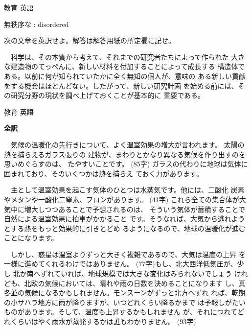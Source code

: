 \documentclass[fleqn]{jbook}
\begin{document}
\begin{question}{教育 英語}{}
\begin{subquestions}
  無秩序な : disordered




\SubQuestion
  次の文章を英訳せよ。解答は解答用紙の所定欄に記せ。

  　科学は、その本質から考えて、それまでの研究者たちによって作られた
  大きな建造物のてっぺんに、新しい材料を付加することによって成長する
  構造体である。以前に何が知られていたかに全く無知の個人が、意味の
  ある新しい貢献をする機会はほとんどない。したがって、新しい研究計画
  を始める前には、その研究分野の現状を調べ上げておくことが基本的に
  重要である。

\end{subquestions}
\end{question}
\begin{answer}{教育 英語}{}

\begin{subanswers}
\SubAnswer
  {\bf 全訳}

  　気候の温暖化の先行きについて、よく温室効果の増大が言われます。
  太陽の熱を捕らえるガラス張りの
  建物が、まわりとかなり異なる気候を作り出すのを思いめぐらすのは、
  たやすいことです。
  (85字)
  ガラスの代わりに地球は気体に囲まれており、そのいくつかは熱を捕らえ
  ておく力があります。

  　主として温室効果を起こす気体のひとつは水蒸気です。他には、二酸化
  炭素やメタンや一酸化二窒素、フロンがあります。
  (41字)
  これら全ての集合体が大気中に増大しつつあることで予想されるのは、
  そういう気体が蓄積することで自然による温室効果に拍車がかかること
  です。そうなれば、大気から逃れようとする熱をもっと効果的に引きとどめ
  るようになるので、地球の温暖化が進むことになります。

  　しかし、惑星は温室よりずっと大きく複雑であるので、大気は温度の上昇
  を一様に進めてくれるわけではありません。
  (77字)もし、北大西洋低気圧が、少し
  北か南へずれていれば、地球規模では大きな変化はみられないでしょう
  けれども、北欧の気候においては、晴れや雨の日数を決めることになります
  し、真冬並の気候になるかもしれません。モンスーンがずっと北方へずれ
  れば、乾期の小サハラ地方に雨が降りますが、いつどれくらい降るかまで
  は予報しがたいものがあります。そして、温度も上昇するかもしれません
  が、それにつれてどれくらいはやく雨水が蒸発するかは誰もわかりません。
  (93字)




\end{subanswers}
\end{answer}
\end{document}
